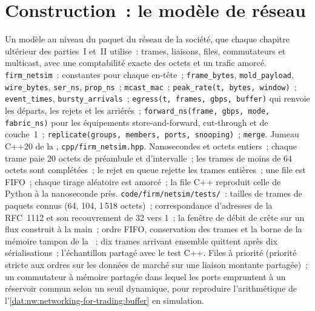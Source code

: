 \section{Construction~: le modèle de réseau}\label{bld:nw:networking-for-trading:netsim}

\begin{build}
 Un modèle au niveau du paquet du réseau de la société, que chaque chapitre ultérieur des parties~I et~II utilise~: trames, liaisons,
files, commutateurs et multicast, avec une comptabilité exacte des octets et un trafic amorcé.
 \texttt{firm\_netsim}~: constantes pour chaque en-tête~; \texttt{frame\_bytes}, \texttt{mold\_payload},
\texttt{wire\_bytes}, \texttt{ser\_ns}, \texttt{prop\_ns}~; \texttt{mcast\_mac}~; \texttt{peak\_rate(t, bytes, window)}~;
\texttt{event\_times}, \texttt{bursty\_arrivals}~; \texttt{egress(t, frames, gbps, buffer)} qui renvoie les départs, les rejets et
les arriérés~; \texttt{forward\_ns(frame, gbps, mode, fabric\_ns)} pour les équipements store-and-forward, cut-through et de couche~1~;
\texttt{replicate(groups, members, ports, snooping)}~; \texttt{merge}. Jumeau C++20 de la ,
\texttt{cpp/firm\_netsim.hpp}.
 Nanosecondes et octets entiers~; chaque trame paie 20 octets de préambule et d'intervalle~; les trames de moins de 64 octets sont
complétées~; le rejet en queue rejette les trames entières~; une file est FIFO~; chaque tirage aléatoire est amorcé~; la file C++ reproduit celle de Python à la
nanoseconde près.
 \texttt{code/firm/netsim/tests/}~: tailles de trames de paquets connus (64, 104, 1\,518 octets)~; correspondance d'adresses de la RFC~1112
et son recouvrement de 32 vers 1~; la fenêtre de débit de crête sur un flux construit à la main~; ordre FIFO, conservation des trames et
la borne de la mémoire tampon de la ~; dix trames arrivant ensemble quittent après dix sérialisations~; l'échantillon partagé avec le
test C++.
 Files à priorité (priorité stricte aux ordres sur les données de marché sur une liaison montante partagée)~; un commutateur à mémoire partagée dans lequel
les ports empruntent à un réservoir commun selon un seuil dynamique, pour reproduire l'arithmétique de l'\cref{dat:nw:networking-for-trading:buffer}
en simulation.
\end{build}


